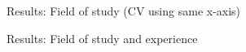 \documentclass[11pt, aspectratio=169]{beamer}
\begin{document}
\begin{frame}{Results: Field of study (CV using same x-axis)}
    \centering
\end{frame}


\begin{frame}{Results: Field of study and experience}
    \centering
\end{frame}
\end{document}
